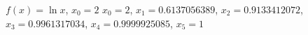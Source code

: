 {$f(x) = \ln x$, $x_0=2$
}
{$x_0=2$, $x_1=0.6137056389$, $x_2=0.9133412072$, $x_3=0.9961317034$, $x_4=0.9999925085$, $x_5=1$
}
